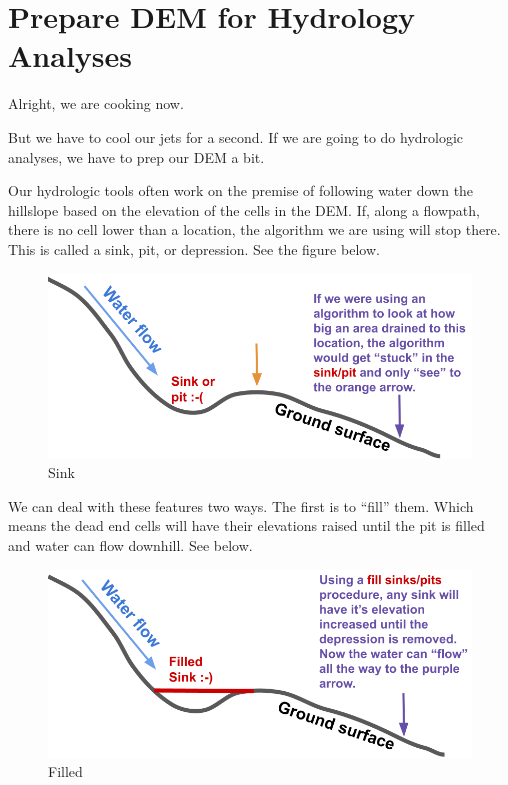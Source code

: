 \documentclass[
]{book}
\begin{document}
\hypertarget{prepare-dem-for-hydrology-analyses}{%
\section{Prepare DEM for Hydrology Analyses}\label{prepare-dem-for-hydrology-analyses}}

Alright, we are cooking now.

But we have to cool our jets for a second. If we are going to do hydrologic analyses, we have to prep our DEM a bit.

Our hydrologic tools often work on the premise of following water down the hillslope based on the elevation of the cells in the DEM. If, along a flowpath, there is no cell lower than a location, the algorithm we are using will stop there. This is called a sink, pit, or depression. See the figure below.

\begin{figure}
\centering
\includegraphics{images/sink.png}
\caption{Sink}
\end{figure}

We can deal with these features two ways. The first is to ``fill'' them. Which means the dead end cells will have their elevations raised until the pit is filled and water can flow downhill. See below.

\begin{figure}
\centering
\includegraphics{images/filled.png}
\caption{Filled}
\end{figure}
\end{document}
